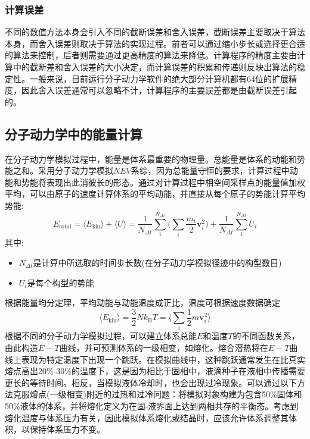 \subsubsection{计算误差}
不同的数值方法本身会引入不同的截断误差和舍入误差，截断误差主要取决于算法本身，而舍入误差则取决于算法的实现过程。前者可以通过缩小步长或选择更合适的算法来控制，后者则需要通过更高精度的算法来降低。计算程序的精度主要由计算中的截断差和舍入误差的大小决定，而计算误差的积累和传递则反映出算法的稳定性。一般来说，目前运行分子动力学软件的绝大部分计算机都有64位的扩展精度，因此舍入误差通常可以忽略不计，计算程序的主要误差都是由截断误差引起的。
\subsection{分子动力学中的能量计算}
在分子动力学模拟过程中，能量是体系最重要的物理量。总能量是体系的动能和势能之和。采用分子动力学模拟$NEV$系综，因为总能量守恒的要求，计算过程中动能和势能将表现出此消彼长的形态。通过对计算过程中相空间采样点的能量值加权平均，可以由原子的速度计算体系的平均动能，并直接从每个原子的势能计算平均势能:
\begin{equation}
	E_{\mathrm{total}}=\langle E_{\mathrm{kin}}\rangle+\langle U\rangle=\dfrac1{N_{\Delta t}}\sum_1^{N_{\Delta t}}\bigg(\sum_i\dfrac{m_i}2\mathbf{v}_i^2\bigg)+\dfrac1{N_{\Delta t}}\sum_1^{N_{\Delta t}}U_i
	\label{eq:MD_Enerty_tot}
\end{equation}
其中:
\begin{itemize}
	\item $N_{\Delta t}$是计算中所选取的时间步长数(在分子动力学模拟径迹中的构型数目)
	\item $U_i$是每个构型的势能
\end{itemize}
根据能量均分定理，平均动能与动能温度成正比，温度可根据速度数据确定
\begin{equation}
	\langle E_{\mathrm{kin}}\rangle=\dfrac32Nk_{\mathrm{B}}T=\bigg\langle\sum_i\dfrac12m\mathbf{v}_i^2\bigg\rangle
	\label{eq:Energy_T}
\end{equation}
根据不同的分子动力学模拟过程，可以建立体系总能$E$和温度$T$的不同函数关系，由此构造$E-T$曲线，并可预测体系的一级相变，如熔化。熔合潜热将在$E-T$曲线上表现为特定温度下出现一个跳跃。在模拟曲线中，这种跳跃通常发生在比真实熔点高出20\%-30\%的温度下，这是因为相比于固相中，液滴种子在液相中传播需要更长的等待时间。相反，当模拟液体冷却时，也会出现过冷现象。可以通过以下方法克服熔点(一级相变)附近的过热和过冷问题：将模拟对象构建为包含50\%固体和50\%液体的体系，并将熔化定义为在固-液界面上达到两相共存的平衡态。考虑到熔化温度与体系压力有关，因此模拟体系熔化或结晶时，应该允许体系调整其体积，以保持体系压力不变。
